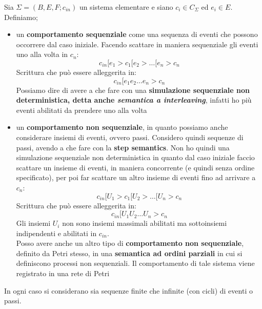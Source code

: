 \documentclass[a4paper,12pt, oneside]{book}
\begin{document}
\begin{definizione}
  Sia $\Sigma=(B,E,F;c_{in})$ un sistema elementare e siano $c_i\in C_\Sigma$ ed
  $e_i\in E$.\\
  Definiamo;
  \begin{itemize}
    \item un \textbf{comportamento sequenziale} come una sequenza di eventi che
    possono occorrere dal caso iniziale. Facendo scattare in maniera sequenziale
    gli eventi uno alla volta in $c_n$:
    \[c_{in} [e_1 > c_1 [e_2 > \ldots[e_n > c_n\]
    Scrittura che può essere alleggerita in:
    \[c_{in} [e_1 e_2 \ldots e_n > c_n\]
    Possiamo dire di avere a che fare con una \textbf{simulazione sequenziale
      non deterministica, detta anche \textit{semantica a interleaving}},
    infatti ho più eventi abilitati da prendere uno alla volta
    \item un \textbf{comportamento non sequenziale}, in quanto possiamo anche
    considerare insiemi di eventi, ovvero passi. Considero quindi sequenze di
    passi, avendo a che fare con la \textbf{step semantics}. Non ho quindi una
    simulazione sequenziale non deterministica in quanto dal caso iniziale
    faccio scattare un insieme di eventi, in maniera concorrente (e quindi senza
    ordine specificato), per poi far scattare un altro insieme di eventi fino ad
    arrivare a $c_n$: 
    \[c_{in} [U_1 > c_1 [U_2 > \ldots [U_n > c_n\]
    Scrittura che può essere alleggerita in:
    \[c_{in} [U_1 U_2 \ldots U_n > c_n\]
    Gli insiemi $U_i$ non sono insiemi massimali abilitati ma sottoinsiemi
    indipendenti e abilitati in $c_{in}$.\\
    Posso avere anche un altro tipo di \textbf{comportamento non sequenziale},
    definito da Petri stesso, in una \textbf{semantica ad ordini parziali} in
    cui si definiscono processi non sequenziali. Il comportamento di tale
    sistema viene registrato in una rete di Petri
  \end{itemize}
  In ogni caso si considerano sia sequenze finite che infinite (con cicli) di
  eventi o passi. 
\end{definizione}
\newpage
\end{document}
